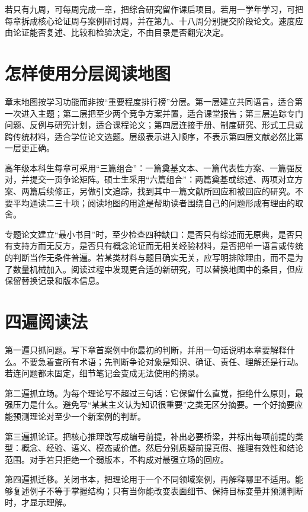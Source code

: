 若只有九周，可每周完成一章，把综合研究留作课后项目。若用一学年学习，可把每章拆成核心论证周与案例研讨周，并在第九、十八周分别提交阶段论文。速度应由论证能否复述、比较和检验决定，不由目录是否翻完决定。

\section{怎样使用分层阅读地图}

章末地图按学习功能而非按“重要程度排行榜”分层。第一层建立共同语言，适合第一次进入主题；第二层把至少两个竞争方案并置，适合课堂报告；第三层追踪专门问题、反例与研究计划，适合课程论文；第四层连接手册、制度研究、形式工具或跨传统材料，适合学位论文选题。层级表示进入顺序，不表示第四层文献必然比第一层更正确。

高年级本科生每章可采用“三篇组合”：一篇奠基文本、一篇代表性方案、一篇强反对，并提交一页争论矩阵。硕士生采用“六篇组合”：两篇奠基或综述、两项对立方案、两篇后续修正，另做引文追踪，找到其中一篇文献所回应和被回应的研究。不要平均通读二三十项；阅读地图的用途是帮助读者围绕自己的问题形成有理由的取舍。

专题论文建立“最小书目”时，至少检查四种缺口：是否只有综述而无原典，是否只有支持方而无反方，是否只有概念论证而无相关经验材料，是否把单一语言或传统的判断当作无条件普遍。若某类材料与题目确实无关，应写明排除理由，而不是为了数量机械加入。阅读过程中发现更合适的新研究，可以替换地图中的条目，但应保留替换记录和版本信息。

\section{四遍阅读法}

第一遍只抓问题。写下章首案例中你最初的判断，并用一句话说明本章要解释什么。不要急着查所有术语；先判断争论对象是知识、确证、责任、理解还是行动。若连问题都未固定，细节笔记会变成无法使用的摘录。

第二遍抓立场。为每个理论写不超过三句话：它保留什么直觉，拒绝什么原则，最强压力是什么。避免写“某某主义认为知识很重要”之类无区分摘要。一个好摘要应能预测理论对至少一个新案例的判断。

第三遍抓论证。把核心推理改写成编号前提，补出必要桥梁，并标出每项前提的类型：概念、经验、语义、模态或价值。然后分别质疑前提真假、推理有效性和结论范围。对手若只拒绝一个弱版本，不构成对最强立场的回应。

第四遍抓迁移。关闭书本，把理论用于一个不同领域案例，再解释哪里不适用。能够复述例子不等于掌握结构；只有当你能改变表面细节、保持目标变量并预测判断时，才显示理解。

